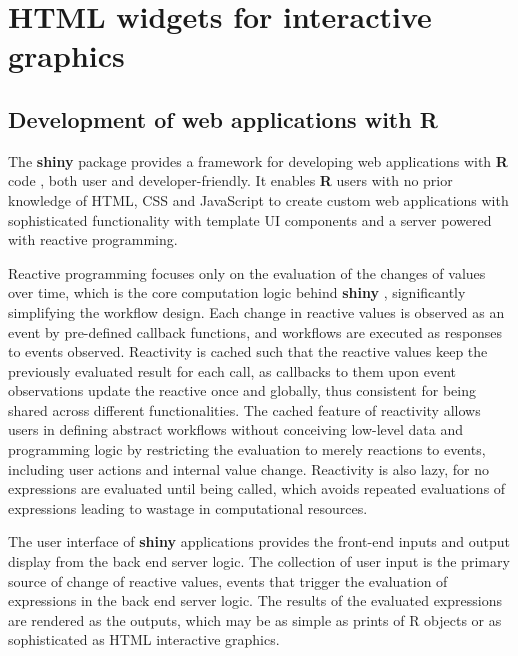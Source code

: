 \documentclass{aucklandthesis}
\begin{document}
\hypertarget{html-widgets-for-interactive-graphics}{%
\section{HTML widgets for interactive graphics}\label{html-widgets-for-interactive-graphics}}

\hypertarget{sec:shiny}{%
\subsection{Development of web applications with R}\label{sec:shiny}}

The \textbf{shiny} package \autocite{shiny} provides a framework for developing web applications with \textbf{R} code \autocite{R2021}, both user and developer-friendly. It enables \textbf{R} users with no prior knowledge of HTML, CSS and JavaScript to create custom web applications with sophisticated functionality with template UI components and a server powered with reactive programming.

Reactive programming focuses only on the evaluation of the changes of values over time, which is the core computation logic behind \textbf{shiny} \autocite{mshiny}, significantly simplifying the workflow design. Each change in reactive values is observed as an event by pre-defined callback functions, and workflows are executed as responses to events observed. Reactivity is cached such that the reactive values keep the previously evaluated result for each call, as callbacks to them upon event observations update the reactive once and globally, thus consistent for being shared across different functionalities. The cached feature of reactivity allows users in defining abstract workflows without conceiving low-level data and programming logic by restricting the evaluation to merely reactions to events, including user actions and internal value change. Reactivity is also lazy, for no expressions are evaluated until being called, which avoids repeated evaluations of expressions leading to wastage in computational resources.

The user interface of \textbf{shiny} applications provides the front-end inputs and output display from the back end server logic. The collection of user input is the primary source of change of reactive values, events that trigger the evaluation of expressions in the back end server logic. The results of the evaluated expressions are rendered as the outputs, which may be as simple as prints of R objects or as sophisticated as HTML interactive graphics.
\end{document}
